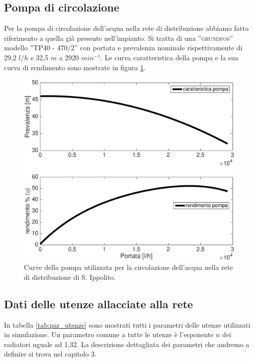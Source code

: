 \documentclass[laurea,oneside,11pt]{USiena_tesiLM}
\begin{document}
\subsection{Pompa di circolazione}

Per la pompa di circolazione dell'acqua nella rete di distribuzione abbiamo fatto riferimento a quella già presente nell'impianto. Si tratta di una ''\textsc{grundfos}'' modello ''\textsc{TP40 - 470/2}'' con portata e prevalenza nominale rispettivamente di 29,2 $l/h$ e 32,5 $m$ a 2920 $min^{-1}$.
Le curva caratteristica della pompa e la sua curva di rendimento sono mostrate in figura \ref{fig:curve_pompa}.

\begin{figure}[!ht]
\centering
\includegraphics[width=\textwidth]{figure/curve_pompa} 
\caption{Curve della pompa utilizzata per la circolazione dell'acqua nella rete di distribuzione di S. Ippolito. }
\label{fig:curve_pompa}
\end{figure}

\subsection{Dati delle utenze allacciate alla rete}
In tabella \ref{tab:par_utenze} sono mostrati tutti i parametri delle utenze utilizzati in simulazione. Un parametro comune a tutte le utenze è l'esponente $n$ dei radiatori uguale ad 1,32.
La descrizione dettagliata dei parametri che andremo a definire si trova nel capitolo 3. 
\end{document}
